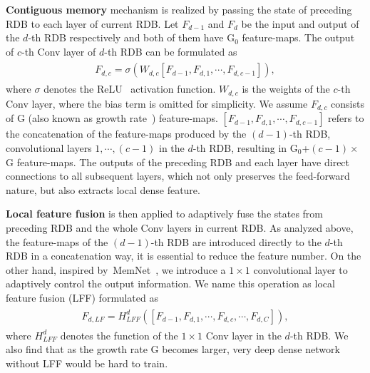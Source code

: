 \documentclass[10pt,twocolumn,letterpaper]{article}
\begin{document}
\textbf{Contiguous memory} mechanism is realized by passing the state of preceding RDB to each layer of current RDB. Let $F_{d-1}$ and $F_{d}$ be the input and output of the $d$-th RDB respectively and both of them have G$_{0}$ feature-maps. The output of $c$-th Conv layer of $d$-th RDB can be formulated as
\begin{align}
\begin{split}
\label{eq:F_d_c}
F_{d,c}=\sigma \left ( W_{d,c}\left [ F_{d-1},F_{d,1},\cdots ,F_{d,c-1} \right ]  \right ),
\end{split}
\end{align}
where $\sigma$ denotes the ReLU~\cite{glorot2011deep} activation function. $W_{d,c}$ is the weights of the $c$-th Conv layer, where the bias term is omitted for simplicity. We assume $F_{d,c}$ consists of G (also known as growth rate~\cite{huang2017densely}) feature-maps. $\left [ F_{d-1},F_{d,1},\cdots ,F_{d,c-1} \right ]$ refers to the concatenation of the feature-maps produced by the $(d-1)$-th RDB, convolutional layers $1,\cdots ,\left ( c-1 \right )$ in the $d$-th RDB, resulting in G$_{0}$+$\left ( c-1 \right )\times $G feature-maps. The outputs of the preceding RDB and each layer have direct connections to all subsequent layers, which not only preserves the feed-forward nature, but also extracts local dense feature.

\textbf{Local feature fusion} is then applied to adaptively fuse the states from preceding RDB and the whole Conv layers in current RDB. As analyzed above, the feature-maps of the $\left ( d-1 \right )$-th RDB are introduced directly to the $d$-th RDB in a concatenation way, it is essential to reduce the feature number. On the other hand, inspired by~MemNet~\cite{tai2017memnet}, we introduce a $1\times 1$ convolutional layer to adaptively control the output information. We name this operation as local feature fusion (LFF) formulated as
\begin{align}
\begin{split}
\label{eq:F_d_LF}
F_{d,LF}=H_{LFF}^{d}\left ( \left [ F_{d-1},F_{d,1},\cdots ,F_{d,c},\cdots ,F_{d,C}\right ] \right ),
\end{split}
\end{align}
where $H_{LFF}^{d}$ denotes the function of the $1\times 1$ Conv layer in the $d$-th RDB. We also find that as the growth rate G becomes larger, very deep dense network without LFF would be hard to train.
\end{document}
